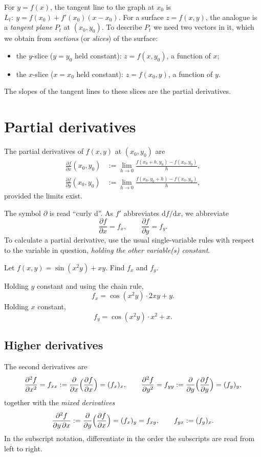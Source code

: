 For $y=f(x)$, the tangent line to the graph at $x_0$ is
$L_t:\ y=f(x_0)+f'(x_0)(x-x_0)$. For a surface $z=f(x,y)$, the analogue is a
\emph{tangent plane} $P_t$ at $(x_0,y_0)$. To describe $P_t$ we need two
vectors in it, which we obtain from \emph{sections} (or \emph{slices}) of the
surface:
\begin{itemize}
 \item the $y$-slice ($y=y_0$ held constant): $z=f(x,y_0)$, a function of $x$;
 \item the $x$-slice ($x=x_0$ held constant): $z=f(x_0,y)$, a function of $y$.
\end{itemize}
The slopes of the tangent lines to these slices are the partial derivatives.

\section{Partial derivatives}

\begin{definition}
The partial derivatives of $f(x,y)$ at $(x_0,y_0)$ are
\begin{align*}
 \frac{\partial f}{\partial x}(x_0,y_0)
 &:=\lim_{h\to0}\frac{f(x_0+h,y_0)-f(x_0,y_0)}{h},\\
 \frac{\partial f}{\partial y}(x_0,y_0)
 &:=\lim_{h\to0}\frac{f(x_0,y_0+h)-f(x_0,y_0)}{h},
\end{align*}
provided the limits exist.
\end{definition}

The symbol $\partial$ is read ``curly d''. As $f'$ abbreviates
$\mathrm df/\mathrm dx$, we abbreviate
\[
 \frac{\partial f}{\partial x}=f_x,\qquad \frac{\partial f}{\partial y}=f_y.
\]
To calculate a partial derivative, use the usual single-variable rules with
respect to the variable in question, \emph{holding the other variable(s) constant}.

\begin{example}
Let $f(x,y)=\sin(x^2y)+xy$. Find $f_x$ and $f_y$.

Holding $y$ constant and using the chain rule,
\[
 f_x=\cos(x^2y)\cdot2xy+y.
\]
Holding $x$ constant,
\[
 f_y=\cos(x^2y)\cdot x^2+x.
\]
\end{example}

\subsection{Higher derivatives}
The second derivatives are
\[
 \frac{\partial^2f}{\partial x^2}=f_{xx}:=\frac{\partial}{\partial x}\Bigl(\frac{\partial f}{\partial x}\Bigr)=(f_x)_x,
 \qquad
 \frac{\partial^2f}{\partial y^2}=f_{yy}:=\frac{\partial}{\partial y}\Bigl(\frac{\partial f}{\partial y}\Bigr)=(f_y)_y,
\]
together with the \emph{mixed derivatives}
\[
 \frac{\partial^2f}{\partial y\,\partial x}:=\frac{\partial}{\partial y}\Bigl(\frac{\partial f}{\partial x}\Bigr)=(f_x)_y=f_{xy},
 \qquad
 f_{yx}:=(f_y)_x.
\]
In the subscript notation, differentiate in the order the subscripts are read
from left to right.

